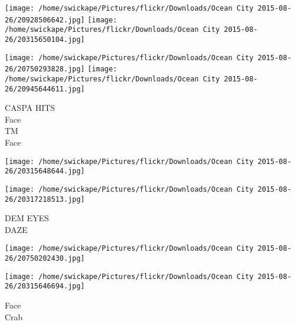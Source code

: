 \documentclass[10pt,letterpaper]{article}
\begin{document}
\texttt{[image: /home/swickape/Pictures/flickr/Downloads/Ocean City 2015-08-26/20928506642.jpg]}
\texttt{[image: /home/swickape/Pictures/flickr/Downloads/Ocean City 2015-08-26/20315650104.jpg]}

\texttt{[image: /home/swickape/Pictures/flickr/Downloads/Ocean City 2015-08-26/20750293828.jpg]}
\texttt{[image: /home/swickape/Pictures/flickr/Downloads/Ocean City 2015-08-26/20945644611.jpg]}

CASPA HITS\\
Face\\
TM\\
Face
\pagebreak

\texttt{[image: /home/swickape/Pictures/flickr/Downloads/Ocean City 2015-08-26/20315648644.jpg]}

\vspace{0.25in}
\texttt{[image: /home/swickape/Pictures/flickr/Downloads/Ocean City 2015-08-26/20317218513.jpg]}

DEM EYES\\
DAZE
\pagebreak

\texttt{[image: /home/swickape/Pictures/flickr/Downloads/Ocean City 2015-08-26/20750202430.jpg]}

\vspace{0.25in}
\texttt{[image: /home/swickape/Pictures/flickr/Downloads/Ocean City 2015-08-26/20315646694.jpg]}

Face\\
Crab
\pagebreak
\end{document}
